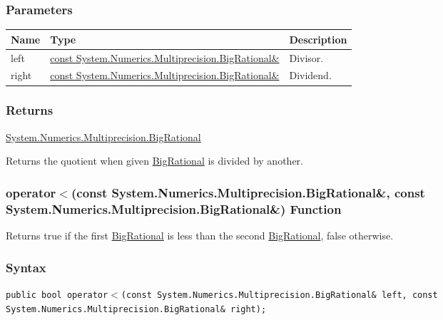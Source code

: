 \documentclass[a4paper,oneside,11.000000pt]{book}
\begin{document}
\subsubsection*{Parameters}
\begin{flushleft}
\begin{supertabular}[l]{!{\raggedright}p{1.30721cm}!{\raggedright}p{8.55945cm}!{\raggedright}p{2.65538cm}}
\textbf{Name}
& \textbf{Type}
& \textbf{Description}
\\
\hline
left
& \hyperlink{System.Numerics.Multiprecision.BigRational}{const System.\-Numerics.\-Multiprecision.\-BigRational\&\-}
& Divisor.

\\
right
& \hyperlink{System.Numerics.Multiprecision.BigRational}{const System.\-Numerics.\-Multiprecision.\-BigRational\&\-}
& Dividend.

\\
\end{supertabular}

\end{flushleft}
\subsubsection*{Returns}
\hyperlink{System.Numerics.Multiprecision.BigRational}{System.\-Numerics.\-Multiprecision.\-BigRational}
\begin{flushleft}
Returns the quotient when given \hyperlink{System.Numerics.Multiprecision.BigRational}{BigRational} is divided by another.

\end{flushleft}
\clearpage

\hypertarget{System.Numerics.Multiprecision.operator.less.C.R.System.Numerics.Multiprecision.BigRational.C.R.System.Numerics.Multiprecision.BigRational}{\subsubsection*{operator$<$(const System.Numerics.Multiprecision.BigRational\&, const System.Numerics.Multiprecision.BigRational\&) Function}}
\begin{flushleft}
Returns true if the first \hyperlink{System.Numerics.Multiprecision.BigRational}{BigRational} is less than the second \hyperlink{System.Numerics.Multiprecision.BigRational}{BigRational}, false otherwise.

\end{flushleft}
\subsubsection*{Syntax}
\texttt{public bool operator$<$(const System.Numerics.Multiprecision.BigRational\& left, const System.Numerics.Multiprecision.BigRational\& right);}
\end{document}
